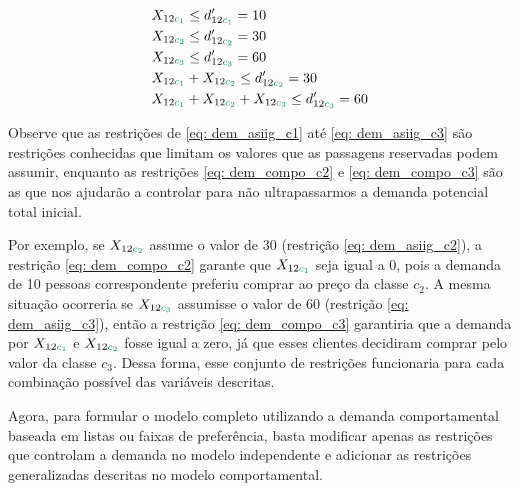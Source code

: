 \begin{align}
    & X_{12\textcolor[rgb]{0.0588, 0.5412, 0.4275}{c_1}} \leq d'_{12\textcolor[rgb]{0.0588, 0.5412, 0.4275}{c_1}} = 10                        \label{eq: dem_asiig_c1} \\
    & X_{12\textcolor[rgb]{0.0588, 0.5412, 0.4275}{c_2}} \leq d'_{12\textcolor[rgb]{0.0588, 0.5412, 0.4275}{c_2}} = 30                        \label{eq: dem_asiig_c2} \\
    & X_{12\textcolor[rgb]{0.0588, 0.5412, 0.4275}{c_3}} \leq d'_{12\textcolor[rgb]{0.0588, 0.5412, 0.4275}{c_3}} = 60                      \label{eq: dem_asiig_c3} \\
    & X_{12\textcolor[rgb]{0.0588, 0.5412, 0.4275}{c_1}} + X_{12\textcolor[rgb]{0.0588, 0.5412, 0.4275}{c_2}} \leq d'_{12\textcolor[rgb]{0.0588, 0.5412, 0.4275}{c_2}}  = 30           \label{eq: dem_compo_c2} \\
    & X_{12\textcolor[rgb]{0.0588, 0.5412, 0.4275}{c_1}} + X_{12\textcolor[rgb]{0.0588, 0.5412, 0.4275}{c_2}} + X_{12\textcolor[rgb]{0.0588, 0.5412, 0.4275}{c_3}} \leq d'_{12\textcolor[rgb]{0.0588, 0.5412, 0.4275}{c_3}} = 60 \label{eq: dem_compo_c3}                    
\end{align}

Observe que as restrições de \ref{eq: dem_asiig_c1} até \ref{eq: dem_asiig_c3} são restrições conhecidas que limitam os valores que as passagens reservadas podem assumir, enquanto as restrições \ref{eq: dem_compo_c2} e \ref{eq: dem_compo_c3} são as que nos ajudarão a controlar para não ultrapassarmos a demanda potencial total inicial. 

Por exemplo, se $X_{12\textcolor[rgb]{0.0588, 0.5412, 0.4275}{c_2}}$ assume o valor de 30 (restrição \ref{eq: dem_asiig_c2}), a restrição \ref{eq: dem_compo_c2} garante que $X_{12\textcolor[rgb]{0.0588, 0.5412, 0.4275}{c_1}}$ seja igual a 0, pois a demanda de 10 pessoas correspondente preferiu comprar ao preço da classe $c_2$. A mesma situação ocorreria se $X_{12\textcolor[rgb]{0.0588, 0.5412, 0.4275}{c_3}}$ assumisse o valor de 60 (restrição \ref{eq: dem_asiig_c3}), então a restrição \ref{eq: dem_compo_c3} garantiria que a demanda por $X_{12\textcolor[rgb]{0.0588, 0.5412, 0.4275}{c_1}}$ e $X_{12\textcolor[rgb]{0.0588, 0.5412, 0.4275}{c_2}}$ fosse igual a zero, já que esses clientes decidiram comprar pelo valor da classe $c_3$. Dessa forma, esse conjunto de restrições funcionaria para cada combinação possível das variáveis descritas.

Agora, para formular o modelo completo utilizando a demanda comportamental baseada em listas ou faixas de preferência, basta modificar apenas as restrições que controlam a demanda no modelo independente e adicionar as restrições generalizadas descritas no modelo comportamental.

